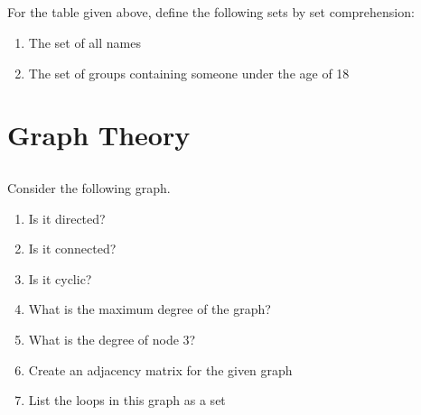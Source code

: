 \documentclass[twocolumn]{article}
\begin{document}
\subsection{}

    For the table given above, define the following sets by set comprehension:

    \begin{enumerate}
        \item The set of all names
        \item The set of groups containing someone under the age of 18
    \end{enumerate}

\clearpage
\section{Graph Theory}

\subsection{}

    Consider the following graph.

    \begin{figure}[h!]
        \centering
    \end{figure}

    \begin{enumerate}
        \item Is it directed?
        \item Is it connected?
        \item Is it cyclic?
        \item What is the maximum degree of the graph?
        \item What is the degree of node 3?
        \item Create an adjacency matrix for the given graph
        \item List the loops in this graph as a set
    \end{enumerate}
\end{document}
